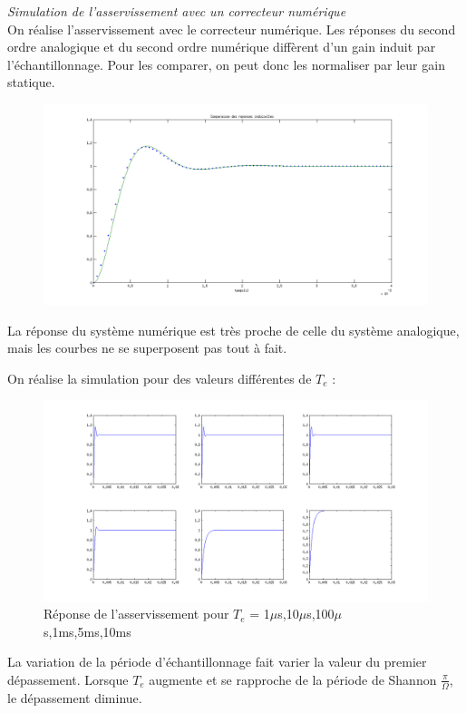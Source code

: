 \documentclass[../../Cours_M1.tex]{subfiles}
\begin{document}
\textit{Simulation de l'asservissement avec un correcteur numérique}\\

On réalise l'asservissement avec le correcteur numérique. Les réponses du second ordre analogique et du second ordre numérique diffèrent d'un gain induit par l'échantillonnage. Pour les comparer, on peut donc les normaliser par leur gain statique.

\begin{figure}[h!]
\includegraphics[scale=0.40]{anal_num.png}
\end{figure}

La réponse du système numérique est très proche de celle du système analogique, mais les courbes ne se superposent pas tout à fait.
\newpage

On réalise la simulation pour des valeurs différentes de $T_e$ :

\begin{figure}[h!]
\includegraphics[scale=0.40]{num_Te.png}
\caption{Réponse de l'asservissement pour $T_e$ = 1$\mu$s,10$\mu$s,100$\mu$s,1ms,5ms,10ms}
\end{figure}

La variation de la période d'échantillonnage fait varier la valeur du premier dépassement. Lorsque $T_e$ augmente et se rapproche de la période de Shannon $\frac{\pi}{\Omega}$, le dépassement  diminue. \\
\end{document}
